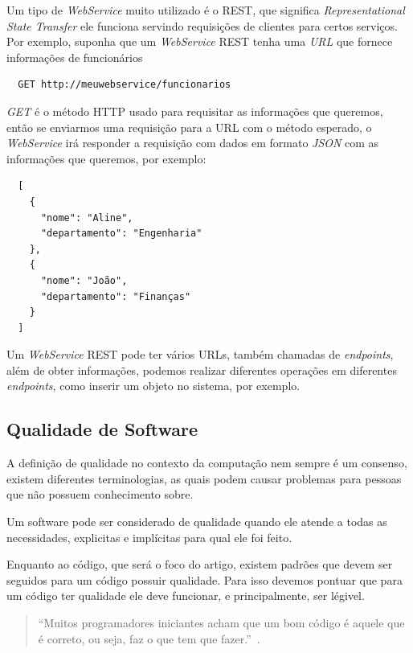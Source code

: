\documentclass[12pt]{article}
\begin{document}
Um tipo de \textit{WebService} muito utilizado é o REST, que significa
\emph{Representational State Transfer} ele funciona servindo requisições de clientes
para certos serviços. Por exemplo, suponha que um \textit{WebService} REST tenha uma \textit{URL} que fornece
informações de funcionários

\begin{verbatim}
  GET http://meuwebservice/funcionarios
\end{verbatim}

\textit{GET} é o método HTTP usado para requisitar as informações que queremos, então se enviarmos uma requisição
para a URL com o método esperado, o \textit{WebService} irá responder a requisição com dados em formato \textit{JSON} com as informações que queremos, por exemplo:

\begin{verbatim}
  [
    {
      "nome": "Aline",
      "departamento": "Engenharia"
    },
    {
      "nome": "João",
      "departamento": "Finanças"
    }
  ]
\end{verbatim}

Um \textit{WebService} REST pode ter vários URLs, também chamadas de \textit{endpoints}, além de obter informações, podemos realizar
diferentes operações em diferentes \textit{endpoints}, como inserir um objeto no sistema, por exemplo.

\subsection{Qualidade de Software}

A definição de qualidade no contexto da computação nem sempre é um consenso,
existem diferentes terminologias, as quais podem causar problemas para pessoas que não
possuem conhecimento sobre.~\cite{Duarte03}

Um software pode ser considerado de qualidade quando ele atende a todas as necessidades, explicitas
e implícitas para qual ele foi feito.~\cite{Duarte03}

Enquanto ao código, que será o foco do artigo, existem padrões que devem ser seguidos para um código
possuir qualidade. Para isso devemos pontuar que para um código ter qualidade ele deve funcionar, e principalmente,
ser légivel.

\begin{quote}
  ``Muitos programadores iniciantes acham que um bom código é aquele que é correto, ou seja, faz o que tem
  que fazer.''~\cite{Levy04}.
\end{quote}
\end{document}
